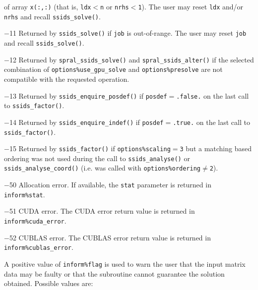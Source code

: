 \begin{description}
            of array {\tt x(:,:)} (that is, {\tt ldx$<$n} or {\tt nrhs$<$1}).
            The user may reset {\tt ldx} and/or {\tt nrhs} and recall
            {\tt ssids\_solve()}.
\item{$-$11} Returned by {\tt ssids\_solve()} if {\tt job} is out-of-range.
            The user may reset {\tt job} and recall {\tt ssids\_solve()}.
\item{$-$12} Returned by {\tt spral\_ssids\_solve()} and 
            {\tt spral\_ssids\_alter()} if the selected combination of
            {\tt options\%use\_gpu\_solve} and {\tt options\%presolve} are not 
            compatible with the requested operation.
\item{$-$13} Returned by {\tt ssids\_enquire\_posdef()} if
            {\tt posdef}$=${\tt .false.} on the last call
            to {\tt ssids\_factor()}.
\item{$-$14} Returned by {\tt ssids\_enquire\_indef()} if
            {\tt posdef}$=${\tt .true.} on the last call to
            {\tt ssids\_factor()}.
\item{$-$15} Returned by {\tt ssids\_factor()} if {\tt options\%scaling$=$3}
            but a matching based ordering was not used during the call to
            {\tt ssids\_analyse()} or {\tt ssids\_analyse\_coord()} (i.e. was
            called with
            {\tt options\%ordering}$\ne${\tt 2}).
\item{$-$50} Allocation error. If available, the {\tt stat}
            parameter is returned in {\tt inform\%stat}.
\item{$-$51} CUDA error. The CUDA error return value is returned in
            {\tt inform\%cuda\_error}.
\item{$-$52} CUBLAS error. The CUBLAS error return value is returned in
            {\tt inform\%cublas\_error}.
\end{description}
A positive value of {\tt inform\%flag}
is used to warn the user that the input matrix data may be faulty or that
the subroutine cannot guarantee the solution obtained.
Possible values are:
